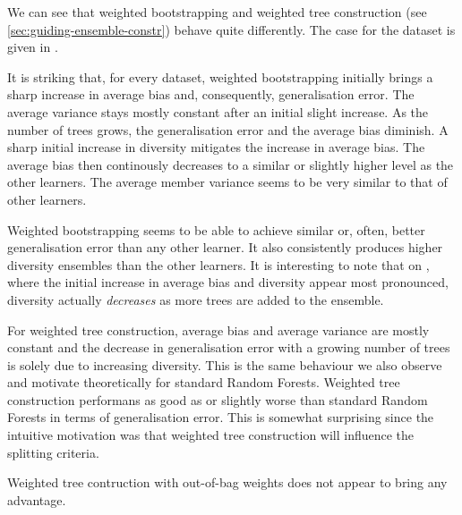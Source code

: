 \documentclass[../main.tex]{subfiles}
\begin{document}


%
We can see that weighted bootstrapping and weighted tree construction (see \ref{sec:guiding-ensemble-constr}) behave quite differently. The case for the \spambase dataset is given in . 

It is striking that, for every dataset, weighted bootstrapping initially brings a sharp increase in average bias and, consequently, generalisation error. The average variance stays mostly constant after an initial slight increase. As the number of trees grows, the generalisation error and the average bias diminish. A sharp initial increase in diversity mitigates the increase in average bias. The average bias then continously decreases to a similar or slightly higher level as the other learners. The average member variance seems to be very similar to that of other learners.

Weighted bootstrapping seems to be able to achieve similar or, often, better generalisation error than any other learner.  It also consistently produces higher diversity ensembles than the other learners.
It is interesting to note that on \spambase, where the initial increase in average bias and diversity appear most pronounced, diversity actually \textit{decreases} as more trees are added to the ensemble. 

For weighted tree construction, average bias and average variance are mostly constant and the decrease in generalisation error with a growing number of trees is solely due to increasing diversity. This is the same behaviour we also observe and motivate theoretically for standard Random Forests. Weighted tree construction performans as good as or slightly worse than standard Random Forests in terms of generalisation error. This is somewhat surprising since the intuitive motivation was that weighted tree construction will influence the splitting criteria. 

Weighted tree contruction with out-of-bag weights does not appear to bring any advantage.
\end{document}
